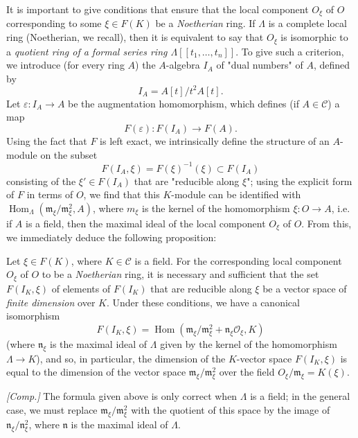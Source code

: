 It is important to give conditions that ensure that the local component $O_\xi$ of $O$ corresponding to some $\xi\in F(K)$ be a \emph{Noetherian} ring.
If $\Lambda$ is a complete local ring (Noetherian, we recall), then it is equivalent to say that $O_\xi$ is isomorphic to a \emph{quotient ring of a formal series ring $\Lambda[{[t_1,\ldots,t_n]}]$}.
To give such a criterion, we introduce (for every ring $A$) the $A$-algebra $I_A$ of "dual numbers" of $A$, defined by
\[
    I_A
    = A[t]/t^2A[t].
\]
Let $\varepsilon\colon I_A\to A$ be the augmentation homomorphism, which defines (if $A\in\mathcal{C}$) a map
\[
    F(\varepsilon)\colon F(I_A) \to F(A).
\]
Using the fact that $F$ is left exact, we intrinsically define the structure of an $A$-module on the subset
\[
    F(I_A,\xi)
    = F(\xi)^{-1}(\xi) \subset F(I_A)
\]
consisting of the $\xi'\in F(I_A)$ that are "reducible along $\xi$";
using the explicit form of $F$ in terms of $O$, we find that this $K$-module can be identified with $\operatorname{Hom}_\Lambda(\mathfrak{m}_{\xi}/\mathfrak{m}_\xi^2,A)$, where $m_\xi$ is the kernel of the homomorphism $\xi\colon O\to A$, i.e. if $A$ is a field, then the maximal ideal of the local component $O_\xi$ of $O$.
From this, we immediately deduce the following proposition:

\begin{proposition}\label{fga3.ii-a.5-proposition-5.1}
    Let $\xi\in F(K)$, where $K\in\mathcal{C}$ is a field.
    For the corresponding local component $O_\xi$ of $O$ to be a \emph{Noetherian} ring, it is necessary and sufficient that the set $F(I_K,\xi)$ of elements of $F(I_K)$ that are reducible along $\xi$ be a vector space of \emph{finite dimension} over $K$.
    Under these conditions, we have a canonical isomorphism
    \[
        F(I_K,\xi)
        = \operatorname{Hom}(\mathfrak{m}_{\xi}/\mathfrak{m}_\xi^2+\mathfrak{n}_\xi\mathcal{O}_\xi, K)
    \]
    (where $\mathfrak{n}_\xi$ is the maximal ideal of $\Lambda$ given by the kernel of the homomorphism $\Lambda\to K$), and so, in particular, the dimension of the $K$-vector space $F(I_K,\xi)$ is equal to the dimension of the vector space $\mathfrak{m}_{\xi}/\mathfrak{m}_\xi^2$ over the field $O_{\xi}/\mathfrak{m}_\xi=K(\xi)$.

    \emph{[Comp.]}
    The formula given above is only correct when $\Lambda$ is a field; in the general case, we must replace $\mathfrak{m}_{\xi}/\mathfrak{m}_\xi^2$ with the quotient of this space by the image of $\mathfrak{n}_{\xi}/\mathfrak{n}_\xi^2$, where $\mathfrak{n}$ is the maximal ideal of $\Lambda$.
\end{proposition}


